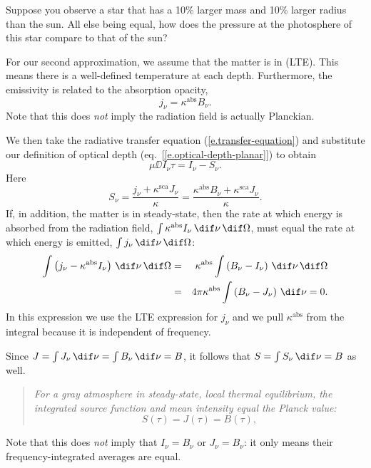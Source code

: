 \begin{exercisebox}
Suppose you observe a star that has a 10\% larger mass and 10\% larger radius than the sun. All else being equal, how does the pressure at the photosphere of this star compare to that of the sun?
\end{exercisebox}

For our second approximation, we assume that the matter is in  (LTE). This means there is a well-defined temperature at each depth. Furthermore, the emissivity is related to the absorption opacity,
\[
	j_{\nu} = \kappa^{\mathrm{abs}}B_{\nu}.
\]
Note that this does \emph{not} imply the radiation field is actually Planckian.

We then take the radiative transfer equation (\ref{e.transfer-equation}) and substitute our definition of optical depth (eq.~[\ref{e.optical-depth-planar}]) to obtain
\begin{equation}\label{e.transfer-gray}
	\mu\DD{I_{\nu}}{\tau} = I_{\nu} - S_{\nu}.
\end{equation}
Here
\[
	S_{\nu} = \frac{j_{\nu} + \kappa^{\mathrm{sca}} J_{\nu}}{\kappa}
	= \frac{\kappa^{\mathrm{abs}} B_{\nu} + \kappa^{\mathrm{sca}} J_{\nu}}{\kappa}.
\]
If, in addition, the matter is in steady-state, then the rate at which energy is absorbed from the radiation field, $\int\kappa^{\mathrm{abs}}I_{\nu}\,\dif\nu\,\dif\Omega$, must equal the rate at which energy is emitted, $\int j_{\nu}\,\dif\nu\,\dif\Omega$:
\begin{eqnarray*}
	\int \left(j_{\nu} - \kappa^{\mathrm{abs}}I_{\nu}\right)\,\dif\nu\,\dif\Omega
	&=& \kappa^{\mathrm{abs}}\int\left(B_{\nu} - I_{\nu}\right)\,\dif\nu\,\dif\Omega\\
	&=& 4\pi\kappa^{\mathrm{abs}}\int\left(B_{\nu} - J_{\nu}\right)\,\dif\nu 
	= 0.
\end{eqnarray*}
In this expression we use the LTE expression for $j_{\nu}$ and we pull $\kappa^{\mathrm{abs}}$ from the integral because it is independent of frequency.

Since $J = \int J_{\nu}\,\dif\nu = \int B_{\nu}\,\dif\nu = B$, it follows that $S = \int S_{\nu}\,\dif\nu = B$ as well.
\begin{quote}
\emph{For a gray atmosphere in steady-state, local thermal equilibrium, the integrated source function and mean intensity equal the Planck value:}
\[ S(\tau) = J(\tau) = B(\tau), \]
\end{quote}
Note that this does \emph{not} imply that $I_{\nu}=B_{\nu}$ or $J_{\nu}=B_{\nu}$: it only means their frequency-integrated averages are equal.

